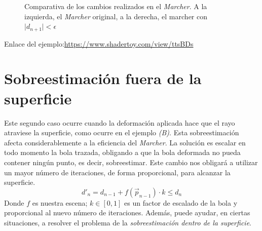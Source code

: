 \begin{figure}[H]
  \centering
  \captionsetup{justification=centering}%
  \hfill
  \caption{Comparativa de los cambios realizados en el \textit{Marcher}. A la izquierda, el \textit{Marcher} original, a la derecha, el marcher con \(\vert d_{n+1}\vert < \epsilon\)}
  \label{fig:intestimacion}
\end{figure}

Enlace del ejemplo:\url{https://www.shadertoy.com/view/ttsBDs}

\section{Sobreestimación fuera de la superficie}
Este segundo caso ocurre cuando la deformación aplicada hace que el rayo atraviese la superficie, como ocurre en el ejemplo \textit{(B)}.
Esta sobreestimación afecta considerablemente a la eficiencia del \textit{Marcher}. La solución es escalar en todo momento la bola trazada, obligando a que la bola deformada no pueda contener ningún punto, es decir, sobreestimar. Este cambio nos obligará a utilizar un mayor número de iteraciones, de forma proporcional, para alcanzar la superficie.
\[d'_{n}=d_{n-1} + f(\Vec{p}_{n-1})\cdot k \leq d_{n}\]
Donde \(f\) es nuestra escena; \(k\in[0,1]\) es un factor de escalado de la bola y proporcional al nuevo número de iteraciones. Además, puede ayudar, en ciertas situaciones, a resolver el problema de la \textit{sobreestimación dentro de la superficie}.


